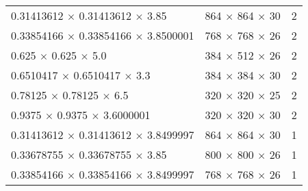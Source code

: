 \begin{table}[H]
\begin{tabularx}{\textwidth}{X X r}
    \num{0.31413612} $ \times $ \num{0.31413612} $ \times $ \num{3.85}       &   \num[minimum-decimal-digits=0,drop-zero-decimal]{864} $ \times $ \num[minimum-decimal-digits=0,drop-zero-decimal]{864} $ \times $ \num[minimum-decimal-digits=0,drop-zero-decimal]{30}  & 2\\
    \num{0.33854166} $ \times $ \num{0.33854166} $ \times $ \num{3.8500001}  &   \num[minimum-decimal-digits=0,drop-zero-decimal]{768} $ \times $ \num[minimum-decimal-digits=0,drop-zero-decimal]{768} $ \times $ \num[minimum-decimal-digits=0,drop-zero-decimal]{26}  & 2\\
    \num{0.625} $ \times $ \num{0.625} $ \times $ \num{5.0}                  &   \num[minimum-decimal-digits=0,drop-zero-decimal]{384} $ \times $ \num[minimum-decimal-digits=0,drop-zero-decimal]{512} $ \times $ \num[minimum-decimal-digits=0,drop-zero-decimal]{26}  & 2\\
    \num{0.6510417} $ \times $ \num{0.6510417} $ \times $ \num{3.3}          &   \num[minimum-decimal-digits=0,drop-zero-decimal]{384} $ \times $ \num[minimum-decimal-digits=0,drop-zero-decimal]{384} $ \times $ \num[minimum-decimal-digits=0,drop-zero-decimal]{30}  & 2\\
    \num{0.78125} $ \times $ \num{0.78125} $ \times $ \num{6.5}              &   \num[minimum-decimal-digits=0,drop-zero-decimal]{320} $ \times $ \num[minimum-decimal-digits=0,drop-zero-decimal]{320} $ \times $ \num[minimum-decimal-digits=0,drop-zero-decimal]{25}  & 2\\
    \num{0.9375} $ \times $ \num{0.9375} $ \times $ \num{3.6000001}          &   \num[minimum-decimal-digits=0,drop-zero-decimal]{320} $ \times $ \num[minimum-decimal-digits=0,drop-zero-decimal]{320} $ \times $ \num[minimum-decimal-digits=0,drop-zero-decimal]{30}  & 2\\
    \num{0.31413612} $ \times $ \num{0.31413612} $ \times $ \num{3.8499997}  &   \num[minimum-decimal-digits=0,drop-zero-decimal]{864} $ \times $ \num[minimum-decimal-digits=0,drop-zero-decimal]{864} $ \times $ \num[minimum-decimal-digits=0,drop-zero-decimal]{30}  & 1\\
    \num{0.33678755} $ \times $ \num{0.33678755} $ \times $ \num{3.85}       &   \num[minimum-decimal-digits=0,drop-zero-decimal]{800} $ \times $ \num[minimum-decimal-digits=0,drop-zero-decimal]{800} $ \times $ \num[minimum-decimal-digits=0,drop-zero-decimal]{26}  & 1\\
    \num{0.33854166} $ \times $ \num{0.33854166} $ \times $ \num{3.8499997}  &   \num[minimum-decimal-digits=0,drop-zero-decimal]{768} $ \times $ \num[minimum-decimal-digits=0,drop-zero-decimal]{768} $ \times $ \num[minimum-decimal-digits=0,drop-zero-decimal]{26}  & 1\\

\end{tabularx}
\end{table}
